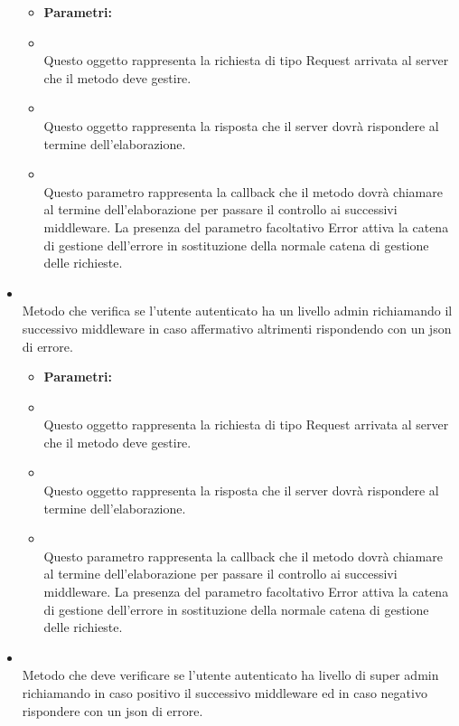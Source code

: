 \begin{itemize}
\begin{itemize}
\item[] \textbf{Parametri:}
\item[]  \\ Questo oggetto rappresenta la richiesta di tipo Request arrivata al server che il metodo deve gestire.
\item[]  \\ Questo oggetto rappresenta la risposta che il server dovrà rispondere al termine dell'elaborazione.
\item[]  \\ Questo parametro rappresenta la callback che il metodo dovrà chiamare al termine dell'elaborazione per passare il controllo ai successivi middleware. La presenza del parametro facoltativo Error attiva la catena di gestione dell'errore in sostituzione della normale catena di gestione delle richieste.
\end{itemize}
\item[] \textbf{} \\ Metodo che verifica se l'utente autenticato ha un livello admin richiamando il successivo middleware in caso affermativo altrimenti rispondendo con un json di errore.
\begin{itemize}\addtolength{\itemsep}{-0.5\baselineskip}
\item[] \textbf{Parametri:}
\item[]  \\ Questo oggetto rappresenta la richiesta di tipo Request arrivata al server che il metodo deve gestire.
\item[]  \\ Questo oggetto rappresenta la risposta che il server dovrà rispondere al termine dell'elaborazione.
\item[]  \\ Questo parametro rappresenta la callback che il metodo dovrà chiamare al termine dell'elaborazione per passare il controllo ai successivi middleware. La presenza del parametro facoltativo Error attiva la catena di gestione dell'errore in sostituzione della normale catena di gestione delle richieste.
\end{itemize}
\item[] \textbf{} \\ Metodo che deve verificare se l'utente autenticato ha livello di super admin richiamando in caso positivo il successivo middleware ed in caso negativo rispondere con un json di errore.

\end{itemize}
